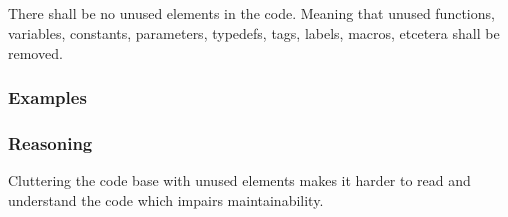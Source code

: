 \subsection*{\codingRule{}}

There shall be no unused elements in the code. Meaning that unused functions, variables, constants, parameters, typedefs, tags, labels, macros, etcetera shall be removed.

\subsubsection*{Examples}

\noindent
\begin{minipage}[t]{\codelstwidth\linewidth}
    
\end{minipage}
\hfill
\begin{minipage}[t]{\codelstwidth\linewidth}
    
\end{minipage}

\subsubsection*{Reasoning}

Cluttering the code base with unused elements makes it harder to read and understand the code which impairs maintainability.